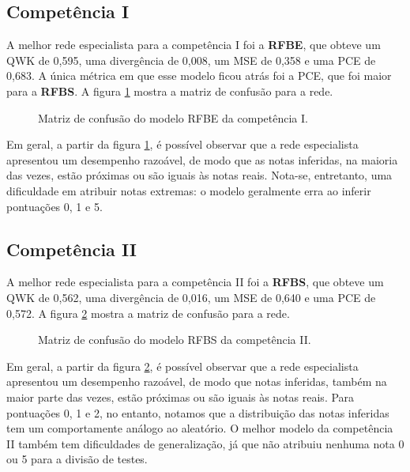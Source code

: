 \subsection{Competência I}
\label{subsec:eval-c1}

A melhor rede especialista para a competência I foi a \textbf{RFBE}, que obteve um QWK de 0,595, uma divergência de 0,008, um MSE de 0,358 e uma PCE de 0,683. A única métrica em que esse modelo ficou atrás foi a PCE, que foi maior para a \textbf{RFBS}. A figura \ref{fig:eval-c1-confusion-matrix} mostra a matriz de confusão para a rede.

\begin{figure}[H]
    \centering
    \resizebox{0.5\textwidth}{!}{}
    \caption{Matriz de confusão do modelo RFBE da competência I.}
    \label{fig:eval-c1-confusion-matrix}
\end{figure}

Em geral, a partir da figura \ref{fig:eval-c1-confusion-matrix}, é possível observar que a rede especialista apresentou um desempenho razoável, de modo que as notas inferidas, na maioria das vezes, estão próximas ou são iguais às notas reais. Nota-se, entretanto, uma dificuldade em atribuir notas extremas: o modelo geralmente erra ao inferir pontuações 0, 1 e 5.

\subsection{Competência II}
\label{subsec:eval-c2}

A melhor rede especialista para a competência II foi a \textbf{RFBS}, que obteve um QWK de 0,562, uma divergência de 0,016, um MSE de 0,640 e uma PCE de 0,572. A figura \ref{fig:eval-c2-confusion-matrix} mostra a matriz de confusão para a rede.

\begin{figure}[H]
    \centering
    \resizebox{0.5\textwidth}{!}{}
    \caption{Matriz de confusão do modelo RFBS da competência II.}
    \label{fig:eval-c2-confusion-matrix}
\end{figure}

Em geral, a partir da figura \ref{fig:eval-c2-confusion-matrix}, é possível observar que a rede especialista apresentou um desempenho razoável, de modo que notas inferidas, também na maior parte das vezes, estão próximas ou são iguais às notas reais. Para pontuações 0, 1 e 2, no entanto, notamos que a distribuição das notas inferidas tem um comportamente análogo ao aleatório. O melhor modelo da competência II também tem dificuldades de generalização, já que não atribuiu nenhuma nota 0 ou 5 para a divisão de testes.

